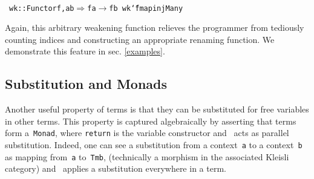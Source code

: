 \documentclass[9pt,authoryear]{sigplanconf}
\begin{document}
{\nopagebreak }

%
%
%
~\\~\vphantom{$\{$}\texttt{wk}\texttt{\mbox{\hspace{0.50em}}}\texttt{{:}{:}}\texttt{\mbox{\hspace{0.50em}}}\texttt{\makebox[1.22ex][l]{$ {(} $}}\texttt{Functor}\texttt{\mbox{\hspace{0.50em}}}\texttt{f,}\texttt{\mbox{\hspace{0.50em}}}\texttt{a}\texttt{\mbox{\hspace{0.50em}}}\texttt{\makebox[1.83ex][c]{$ \subseteq $}}\texttt{\mbox{\hspace{0.50em}}}\texttt{b}\texttt{\makebox[1.22ex][r]{$ {)} $}}\texttt{\mbox{\hspace{0.50em}}}\texttt{$ \Rightarrow $}\texttt{\mbox{\hspace{0.50em}}}\texttt{f}\texttt{\mbox{\hspace{0.50em}}}\texttt{a}\texttt{\mbox{\hspace{0.50em}}}\texttt{$ \rightarrow $}\texttt{\mbox{\hspace{0.50em}}}\texttt{f}\texttt{\mbox{\hspace{0.50em}}}\texttt{b}\texttt{{\nopagebreak \newline%
}\vphantom{$\{$}}\texttt{wk}\texttt{\mbox{\hspace{0.50em}}}\texttt{{\char `\=}}\texttt{\mbox{\hspace{0.50em}}}\texttt{fmap}\texttt{\mbox{\hspace{0.50em}}}\texttt{injMany}\texttt{{\nopagebreak \newline%
}\vphantom{$\{$}}%


%
Again, this arbitrary weakening function relieves the programmer from
    tediously counting indices and constructing an appropriate renaming function. We
    demonstrate this feature in sec. \ref{examples}.%


\subsection{Substitution and Monads\label{monadSec}}

%
Another useful property of terms is that they can be substituted for free variables in
    other terms. This property is captured algebraically by asserting
    that terms form a{~}\texttt{Monad}, where \texttt{return} is the variable
    constructor and{~}\texttt{\makebox[1.22ex][c]{\textgreater{}}} acts as parallel substitution. Indeed, one
    can see a substitution from a context{~}\texttt{a} to a context{~}\texttt{b} as
    mapping from{~}\texttt{a} to{~}\texttt{Tm}\texttt{\mbox{\hspace{0.50em}}}\texttt{b}, (technically a morphism in the associated Kleisli
    category) and{~}\texttt{\makebox[1.22ex][l]{$ {(} $}}\texttt{\makebox[1.22ex][c]{\textgreater{}}}\texttt{\makebox[1.22ex][r]{$ {)} $}} applies a substitution everywhere in a term.%
\end{document}
